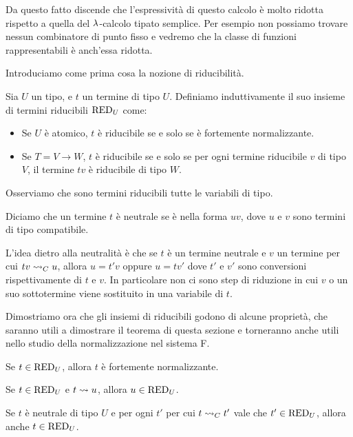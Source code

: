 \documentclass[]{marticle}
\begin{document}
Da questo fatto discende che l'espressivit\`a di questo calcolo \`e molto
ridotta rispetto a quella del $\lambda$-calcolo tipato semplice. Per esempio non
possiamo trovare nessun combinatore di punto fisso e vedremo che la classe di
funzioni rappresentabili \`e anch'essa ridotta.

Introduciamo come prima cosa la nozione di riducibilit\`a. 
\begin{block}[Definizione]
    Sia $U$ un tipo, e $t$ un termine di tipo $U$. Definiamo induttivamente il
    suo insieme di termini riducibili $\text{RED}_{U}$ come:
    \begin{itemize}
        \item Se $U$ \`e atomico, $t$ \`e riducibile se e solo se \`e fortemente
            normalizzante.
        \item Se $T = V \rightarrow W$, $t$ \`e riducibile se e solo se per ogni
            termine riducibile $v$ di tipo $V$, il termine $tv$ \`e riducibile
            di tipo $W$.
    \end{itemize}
\end{block}

Osserviamo che sono termini riducibili tutte le variabili di tipo.

\begin{block}[Definizione]
    Diciamo che un termine $t$ \`e neutrale se \`e nella forma $uv$, dove $u$ e
    $v$ sono termini di tipo compatibile.
\end{block}

L'idea dietro alla neutralit\`a \`e che se $t$ \`e un termine neutrale e $v$ un
termine per cui $tv \rightsquigarrow_C u$, allora $u = t' v$ oppure $u=tv'$ dove $t'$ e $v'$
sono conversioni rispettivamente di $t$ e $v$. In particolare non ci sono
step di riduzione in cui $v$ o un suo sottotermine viene sostituito in una
variabile di $t$.

Dimostriamo ora che gli insiemi di riducibili godono di alcune propriet\`a, che
saranno utili a dimostrare il teorema di questa sezione e torneranno anche utili
nello studio della normalizzazione nel sistema F.

\begin{block}[Proposizione]
    \begin{nlist}[CR1]
        \item Se $t\in \text{RED}_{U}$, allora $t$ \`e fortemente normalizzante.
        \item Se $t\in \text{RED}_{U}$ e $t\rightsquigarrow u$, allora $u\in\text{RED}_{U}$.
        \item Se $t$ \`e neutrale di tipo $U$ e per ogni $t'$ per cui $t\rightsquigarrow_C
            t'$ vale che $t'\in\text{RED}_{U}$, allora anche $t\in\text{RED}_{U}$.
    \end{nlist}
\end{block}
\end{document}
